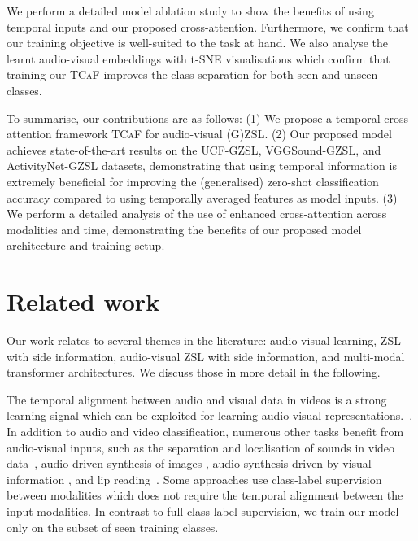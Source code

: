 \documentclass[runningheads]{llncs}
\newcommand{\mypara}[1]{\noindent{\bf{#1}}}
\newcommand{\modelName}{\textsc{TCaF}\xspace}
\newcommand{\activity}{{ActivityNet-GZSL}\xspace}
\newcommand{\ucf}{{UCF-GZSL}\xspace}
\newcommand{\vgg}{{VGGSound-GZSL}\xspace}
\begin{document}
We perform a detailed model ablation study to show the benefits of using temporal inputs and our proposed cross-attention. Furthermore, we confirm that our training objective is well-suited to the task at hand. We also analyse the learnt audio-visual embeddings with t-SNE visualisations which confirm that training our \modelName improves the class separation for both seen and unseen classes.



To summarise, our contributions are as follows: (1) We propose a temporal cross-attention framework \modelName for audio-visual (G)ZSL. (2) Our proposed model achieves state-of-the-art results on the \ucf, \vgg, and \activity datasets, demonstrating that using temporal information is extremely beneficial for improving the (generalised) zero-shot classification accuracy compared to using temporally averaged features as model inputs. (3) We perform a detailed analysis of the use of enhanced cross-attention across modalities and time, demonstrating the benefits of our proposed model architecture and training setup. 

\section{Related work}
Our work relates to several themes in the literature: audio-visual learning, ZSL with side information, audio-visual ZSL with side information, and multi-modal transformer architectures. We discuss those in more detail in the following.

\mypara{Audio-visual learning.}
The temporal alignment between audio and visual data in videos is a strong learning signal which can be exploited for learning audio-visual representations.~\cite{owens2016ambient,owens2018learning,alwassel2019self,patrick2020multi,korbar2018cooperative,aytar2016soundnet}. In addition to audio and video classification, numerous other tasks benefit from audio-visual inputs, such as the separation and localisation of sounds in video data~\cite{owens2018audio,tian2018audio,arandjelovic2018objects,gao2019co,chen2021localizing,Afouras20b,afouras2021selfsupervised}, audio-driven synthesis of images \cite{wiles2018x2face,jamaludin2019you}, audio synthesis driven by visual information \cite{zhou2019vision,goldstein2018guitar,koepke2019visual,koepke2020sight,su2020multi,gan2020foley,narasimhan2021strumming}, and lip reading~\cite{afouras2020asr,afouras2018deep}. Some approaches use class-label supervision between modalities \cite{fayek2020large,chen2021distilling} which does not require the temporal alignment between the input modalities. In contrast to full class-label supervision, we train our model only on the subset of seen training classes. 
\end{document}

